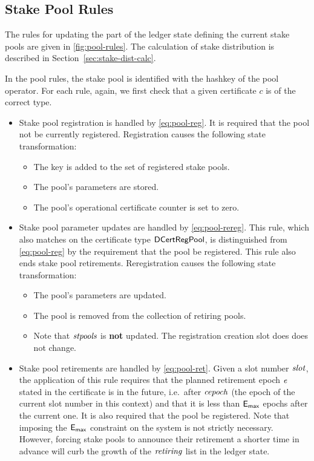 \clearpage

\subsection{Stake Pool Rules}
\label{sec:pool-rules}


The rules for updating the part of the ledger state defining the current stake
pools are given in \cref{fig:pool-rules}. The calculation of stake distribution
is described in Section~\ref{sec:stake-dist-calc}.

In the pool rules, the stake pool is identified with the hashkey of the pool operator.
For each rule, again, we first check that a given certificate $c$ is of the correct type.

\begin{itemize}
  \item Stake pool registration is handled by \cref{eq:pool-reg}.
    It is required that the pool not be currently registered.
    Registration causes the following state transformation:
    \begin{itemize}
      \item The key is added to the set of registered stake pools.
      \item The pool's parameters are stored.
      \item The pool's operational certificate counter is set to zero.
    \end{itemize}
  \item Stake pool parameter updates are handled by \cref{eq:pool-rereg}.
    This rule, which also matches on the certificate type $\mathsf{DCertRegPool}$,
    is distinguished from \cref{eq:pool-reg} by the requirement that
    the pool be registered. This rule also ends stake pool retirements.
    Reregistration causes the following state transformation:
    \begin{itemize}
      \item The pool's parameters are updated.
      \item The pool is removed from the collection of retiring pools.
      \item Note that $\mathit{stpools}$ is \textbf{not} updated.
        The registration creation slot does does not change.
    \end{itemize}
  \item Stake pool retirements are handled by \cref{eq:pool-ret}.
    Given a slot number $\mathit{slot}$, the application of this rule requires that the
    planned retirement epoch $\mathit{e}$ stated in the certificate is in the future,
    i.e.~after $\mathit{cepoch}$ (the epoch of the current slot number in this context) and
    that it is less than $\mathsf{E_{max}}$ epochs after the current one.
    It is also required that the pool be registered.
    Note that imposing the $\mathsf{E_{max}}$ constraint on the system is not strictly necessary.
    However, forcing stake pools to announce their retirement a shorter time in
    advance will curb the growth of the $\mathit{retiring}$ list in the ledger state.


\end{itemize}
